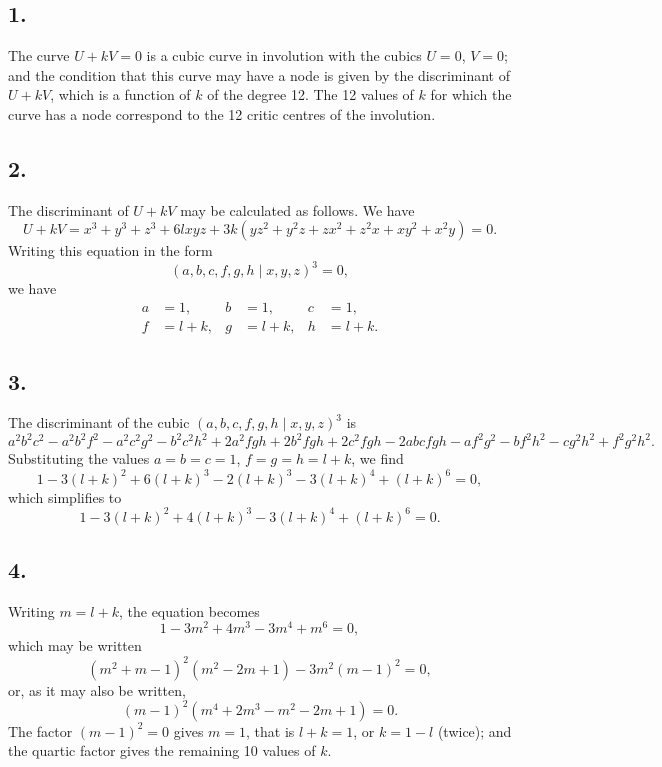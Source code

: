 \documentclass[11pt,a4paper]{article}
\theoremstyle{definition}
\begin{document}
\subsection*{1.}

The curve $U + kV = 0$ is a cubic curve in involution with the cubics $U = 0$, $V = 0$;
and the condition that this curve may have a node is given by the discriminant of
$U + kV$, which is a function of $k$ of the degree 12. The 12 values of $k$ for which the
curve has a node correspond to the 12 critic centres of the involution.

\subsection*{2.}

The discriminant of $U + kV$ may be calculated as follows. We have
\[
U + kV = x^{3} + y^{3} + z^{3} + 6lxyz + 3k(yz^{2} + y^{2}z + zx^{2} + z^{2}x + xy^{2} + x^{2}y) = 0.
\]
Writing this equation in the form
\[
(a, b, c, f, g, h \mid x, y, z)^{3} = 0,
\]
we have
\begin{align*}
a &= 1, & b &= 1, & c &= 1, \\
f &= l + k, & g &= l + k, & h &= l + k.
\end{align*}

\subsection*{3.}

The discriminant of the cubic $(a, b, c, f, g, h \mid x, y, z)^{3}$ is
\[
a^{2}b^{2}c^{2} - a^{2}b^{2}f^{2} - a^{2}c^{2}g^{2} - b^{2}c^{2}h^{2} + 2a^{2}fgh + 2b^{2}fgh + 2c^{2}fgh
- 2abcfgh - af^{2}g^{2} - bf^{2}h^{2} - cg^{2}h^{2} + f^{2}g^{2}h^{2}.
\]
Substituting the values $a = b = c = 1$, $f = g = h = l + k$, we find
\[
1 - 3(l + k)^{2} + 6(l + k)^{3} - 2(l + k)^{3} - 3(l + k)^{4} + (l + k)^{6} = 0,
\]
which simplifies to
\[
1 - 3(l + k)^{2} + 4(l + k)^{3} - 3(l + k)^{4} + (l + k)^{6} = 0.
\]

\newpage
\subsection*{4.}

Writing $m = l + k$, the equation becomes
\[
1 - 3m^{2} + 4m^{3} - 3m^{4} + m^{6} = 0,
\]
which may be written
\[
(m^{2} + m - 1)^{2}(m^{2} - 2m + 1) - 3m^{2}(m - 1)^{2} = 0,
\]
or, as it may also be written,
\[
(m - 1)^{2}(m^{4} + 2m^{3} - m^{2} - 2m + 1) = 0.
\]
The factor $(m - 1)^{2} = 0$ gives $m = 1$, that is $l + k = 1$, or $k = 1 - l$ (twice); and the
quartic factor gives the remaining 10 values of $k$.
\end{document}
